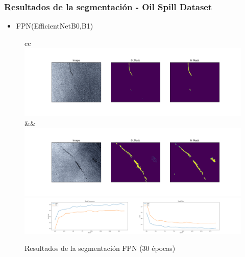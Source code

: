 \begin{frame}
\frametitle{Resultados de la segmentación - Oil Spill Dataset}
\begin{itemize}
    \item FPN(EfficientNetB0,B1)
\end{itemize}

\begin{figure}
    \centering
    \begin{tabular}{cc}
         \includegraphics[scale=0.15]{img/section_06/fpn_efficientnetb0_resultado_01.png}&&
         \includegraphics[scale=0.15]{img/section_06/fpn_efficientnetb1_resultado_02.png}\\
         \includegraphics[scale=0.12]{img/section_06/fpn_efficientnetb1_training_results.png}
    \end{tabular}
    \caption{Resultados de la segmentación FPN (30 épocas)}
    \label{fig:my_label}
\end{figure}
\end{frame}

